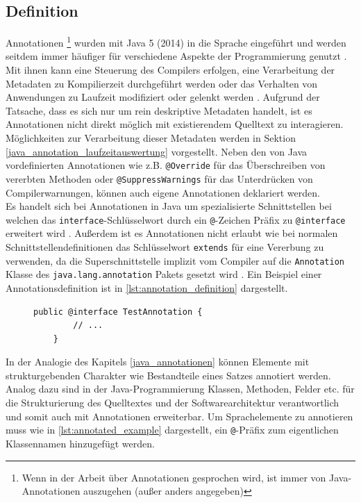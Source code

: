 \subsection{Definition}
\label{java_annotationen_definition}
\noindent Annotationen \footnote{Wenn in der Arbeit über Annotationen gesprochen wird, ist immer von Java-Annotationen auszugehen (außer anders angegeben)} wurden mit Java 5 (2014) in die Sprache eingeführt und werden seitdem immer häufiger für verschiedene Aspekte der Programmierung genutzt \cite{Rocha2011}. Mit ihnen kann eine Steuerung des Compilers erfolgen, eine Verarbeitung der Metadaten zu Kompilierzeit durchgeführt werden oder das Verhalten von Anwendungen zu Laufzeit modifiziert oder gelenkt werden \cite{Yu2019}. Aufgrund der Tatsache, dass es sich nur um rein deskriptive Metadaten handelt, ist es Annotationen nicht direkt möglich mit existierendem Quelltext zu interagieren.  Möglichkeiten zur Verarbeitung dieser Metadaten werden in Sektion \ref{java_annotation_laufzeitauswertung} vorgestellt. Neben den von Java vordefinierten Annotationen wie z.B. \texttt{@Override} für das Überschreiben von vererbten Methoden oder \texttt{@SuppressWarnings} für das Unterdrücken von Compilerwarnungen, können auch eigene Annotationen deklariert werden.\\
Es handelt sich bei Annotationen in Java um spezialisierte Schnittstellen bei welchen das \texttt{interface}-Schlüsselwort durch ein \texttt{@}-Zeichen Präfix zu \texttt{@interface} erweitert wird \cite{Gosling2005}. Außerdem ist es Annotationen nicht erlaubt wie bei normalen Schnittstellendefinitionen das Schlüsselwort \texttt{extends} für eine Vererbung zu verwenden, da die Superschnittstelle implizit vom Compiler auf die \texttt{Annotation} Klasse des \texttt{java.lang.annotation} Pakets gesetzt wird \cite{Oracle2017}. Ein Beispiel einer  Annotationsdefinition ist in \autoref{lst:annotation_definition} dargestellt.
\begin{figure}[H]
	\centering
	\begin{lstlisting}[caption={Beispiel einer Annotationsdefinition.}, captionpos=b, label=lst:annotation_definition]
	public @interface TestAnnotation {
	    // ...
	}
	\end{lstlisting}
\end{figure}
\noindent In der Analogie des Kapitels \ref{java_annotationen} können Elemente mit strukturgebenden Charakter wie Bestandteile eines Satzes annotiert werden. Analog dazu sind in der Java-Programmierung Klassen, Methoden, Felder etc. für die Strukturierung des Quelltextes und der Softwarearchitektur verantwortlich und somit auch mit Annotationen erweiterbar. Um Sprachelemente zu annotieren muss wie in \autoref{lst:annotated_example} dargestellt, ein \texttt{@}-Präfix zum eigentlichen Klassennamen hinzugefügt werden.
